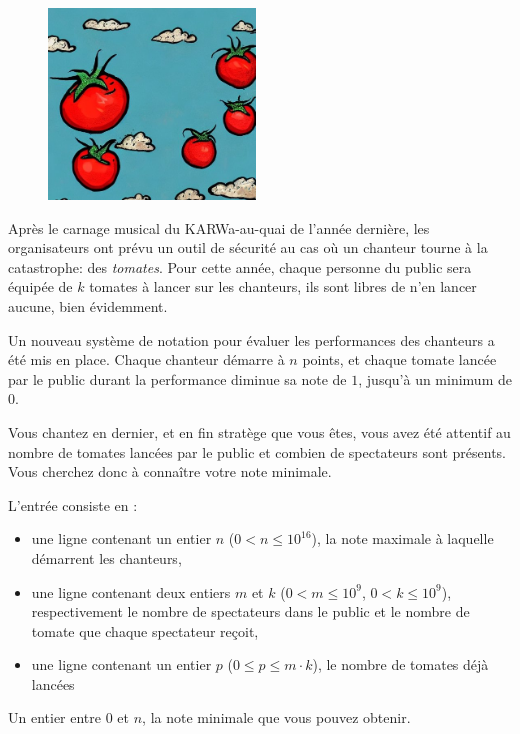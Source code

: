 \problemname{\problemyamlname}

\begin{figure}
    \centering
    \includegraphics[width=5.5cm]{tomates.jpeg}
\end{figure}

Après le carnage musical du KARWa-au-quai de l'année dernière, les organisateurs ont prévu un outil de sécurité au cas où un chanteur tourne à la catastrophe: des \emph{tomates}. Pour cette année, chaque personne du public sera équipée de $k$ tomates à lancer sur les chanteurs, ils sont libres de n'en lancer aucune, bien évidemment.

Un nouveau système de notation pour évaluer les performances des chanteurs a été mis en place. Chaque chanteur démarre à $n$ points, et chaque tomate lancée par le public durant la performance diminue sa note de $1$, jusqu'à un minimum de $0$.

Vous chantez en dernier, et en fin stratège que vous êtes, vous avez été attentif au nombre de tomates lancées par le public et combien de spectateurs sont présents. Vous cherchez donc à connaître votre note minimale.

\begin{Input}
	L'entrée consiste en :
	\begin{itemize}
		\item une ligne contenant un entier $n$ ($0 < n \le 10^16$), la note maximale à laquelle démarrent les chanteurs,
		\item une ligne contenant deux entiers $m$ et $k$ ($0 < m \le 10^9$, $0 < k \le 10^9$), respectivement le nombre de spectateurs dans le public et le nombre de tomate que chaque spectateur reçoit,
		\item une ligne contenant un entier $p$ ($0 \le p \le m \cdot k$), le nombre de tomates déjà lancées
	\end{itemize}
\end{Input}

\begin{Output}
	Un entier entre $0$ et $n$, la note minimale que vous pouvez obtenir.
\end{Output}
